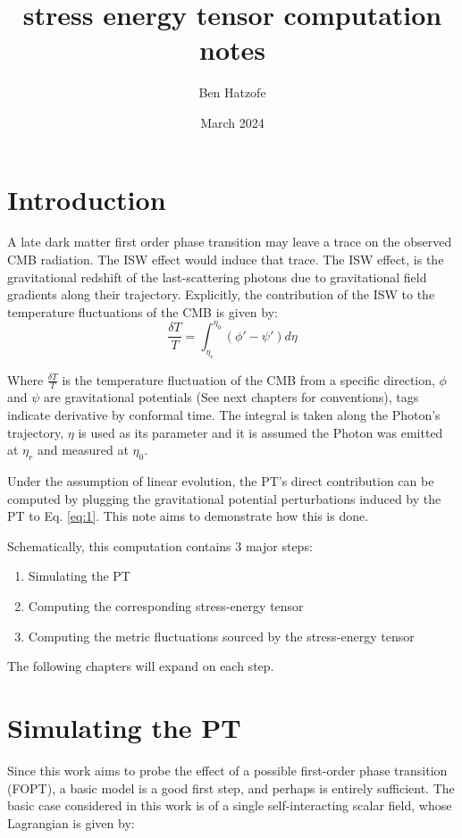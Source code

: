 \documentclass{article}
\title{stress energy tensor computation notes}
\author{Ben Hatzofe }
\date{March 2024}
\begin{document}
\maketitle

\section{Introduction}
A late dark matter first order phase transition may leave a trace on the observed CMB radiation. The ISW effect would induce that trace. The ISW effect, is the gravitational redshift of the last-scattering photons due to gravitational field gradients along their trajectory. 
Explicitly, the contribution of the ISW to the temperature fluctuations of the CMB is given by:
\begin{equation} \label{eq:1}
\frac{\delta T}{T} = \int_{\eta_r}^{\eta_0} (\phi' - \psi') d\eta
\end{equation}

Where $\frac{\delta T}{T}$ is the temperature fluctuation of the CMB from a specific direction, $\phi$ and $\psi$ are gravitational potentials (See next chapters for conventions), tags indicate derivative by conformal time. The integral is taken along the Photon's trajectory, $\eta$ is used as its parameter and it is assumed the Photon was emitted at $\eta_r$ and measured at $\eta_0$.

Under the assumption of linear evolution, the PT's direct contribution can be computed by plugging the gravitational potential perturbations induced by the PT to Eq. \ref{eq:1}. This note aims to demonstrate how this is done. 

Schematically, this computation contains 3 major steps:
\begin{enumerate}
    \item Simulating the PT
    \item Computing the corresponding stress-energy tensor
    \item Computing the metric fluctuations sourced by the stress-energy tensor
\end{enumerate}
The following chapters will expand on each step. 


\section{Simulating the PT}
Since this work aims to probe the effect of a possible first-order phase transition (FOPT), a basic model is a good first step, and perhaps is entirely sufficient. The basic case considered in this work is of a single self-interacting scalar field, whose Lagrangian is given by: 
\end{document}

